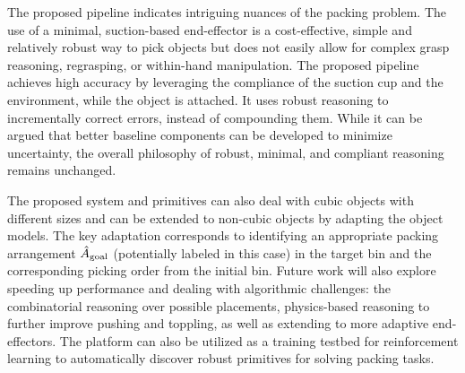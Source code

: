 The proposed pipeline indicates intriguing nuances of the packing problem. The use of a minimal, suction-based end-effector is a cost-effective, simple and relatively robust way to pick objects but does not easily allow for complex grasp reasoning, regrasping, or within-hand manipulation. The proposed pipeline achieves high accuracy by leveraging the compliance of the suction cup and the environment, while the object is attached. It uses robust reasoning to incrementally correct errors, instead of compounding them. While it can be argued that better baseline components can be developed to minimize uncertainty, the overall philosophy of robust, minimal, and compliant reasoning remains unchanged. 

The proposed system and primitives can also deal with cubic objects with different sizes and can be extended to non-cubic objects by adapting the object models. The key adaptation corresponds to identifying an appropriate packing arrangement $\hat{A}_{\rm goal}$ (potentially labeled in this case) in the target bin and the corresponding picking order from the initial bin. Future work will also explore speeding up performance and dealing with algorithmic challenges: the combinatorial reasoning over possible placements, physics-based reasoning to further improve pushing and toppling, as well as extending to more adaptive end-effectors. The platform can also be utilized as a training testbed for reinforcement learning to automatically discover robust primitives for solving packing tasks.

